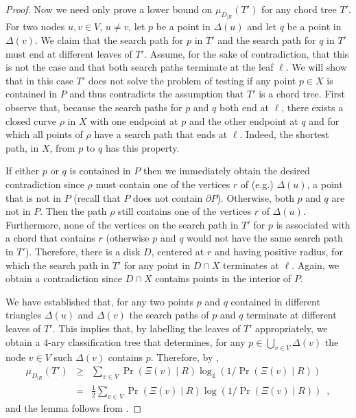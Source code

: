 \documentclass[charterfonts,lotsofwhite]{patmorin}
\newcommand{\boundary}{\partial}
\begin{document}
\begin{proof}
Now we need only prove a lower bound on $\mu_{D_{|R}}(T')$ for any
chord tree $T'$.  For two nodes $u,v\in V$, $u\neq v$, let $p$ be a
point in $\Delta(u)$ and let $q$ be a point in $\Delta(v)$.  
We claim that the search path for $p$ in $T'$ and the search path for
$q$ in $T'$ must end at different leaves of $T'$.  Assume, for the
sake of contradiction, that this is not the case and that both search
paths terminate at the leaf $\ell$. We will show that in this case
$T'$ does not solve the problem of testing if any point $p\in X$ is
contained in $P$ and thus contradicts the assumption that $T'$ is a
chord tree.  First observe that, because the search paths for $p$ and
$q$ both end at $\ell$, there exists a closed curve $\rho$ in $X$ with
one endpoint at $p$ and the other endpoint at $q$ and for which all
points of $\rho$ have a search path that ends at $\ell$.  Indeed, the
shortest path, in $X$, from $p$ to $q$ has this property.

If either $p$ or $q$ is contained in $P$ then we immediately obtain
the desired contradiction since $\rho$ must contain one of the
vertices $r$ of (e.g.) $\Delta(u)$, a point that is not in $P$ (recall
that $P$ does not contain $\boundary P$).  Otherwise, both $p$ and $q$
are not in $P$.  Then the path $\rho$ still contains one of the
vertices $r$ of $\Delta(u)$.  Furthermore, none of the vertices on the
search path in $T'$ for $p$ is associated with a chord that contains
$r$ (otherwise $p$ and $q$ would not have the same search path in
$T'$).  Therefore, there is a disk $D$, centered at $r$ and having
positive radius, for which the search path in $T'$ for any point in
$D\cap X$ terminates at $\ell$.  Again, we obtain a contradiction
since $D\cap X$ contains points in the interior of $P$.

We have established that, for any two points $p$ and $q$
contained in different triangles $\Delta(u)$ and $\Delta(v)$ the
search paths of $p$ and $q$ terminate at different leaves of $T'$.
This implies that, by labelling the leaves of $T'$ appropriately, we
obtain a $4$-ary classification tree that determines, for any
$p\in \bigcup_{v\in V} \Delta(v)$ the node $v\in V$ such
$\Delta(v)$ contains $p$.  Therefore, by ,
\begin{eqnarray*}
  \mu_{D_{|R}} (T') 
   &\ge& \sum_{v\in V}\Pr(\Xi(v)\mid R)\log_4(1/\Pr(\Xi(v)\mid R)) \\
   &=& \frac{1}{2}\sum_{v\in V}\Pr(\Xi(v)\mid R)\log(1/\Pr(\Xi(v)\mid R)) \enspace ,
\end{eqnarray*}
and the lemma follows from .
\end{proof}
\end{document}
